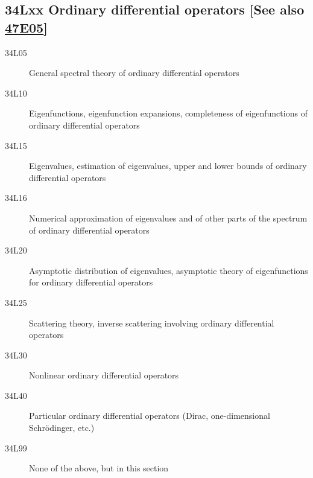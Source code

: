 \subsection*{34Lxx  Ordinary differential operators [See also \hyperref[47E05]{47E05}] }\label{34Lxx}
\begin{description}  
\item [34L05]\label{34L05} General spectral theory of ordinary differential operators
\item [34L10]\label{34L10} Eigenfunctions, eigenfunction expansions, completeness of eigenfunctions of ordinary differential operators
\item [34L15]\label{34L15} Eigenvalues, estimation of eigenvalues, upper and lower bounds of ordinary differential operators
\item [34L16]\label{34L16} Numerical approximation of eigenvalues and of other parts of the spectrum of ordinary differential operators
\item [34L20]\label{34L20} Asymptotic distribution of eigenvalues, asymptotic theory of eigenfunctions for ordinary differential operators
\item [34L25]\label{34L25} Scattering theory, inverse scattering involving ordinary differential operators
\item [34L30]\label{34L30} Nonlinear ordinary differential operators
\item [34L40]\label{34L40} Particular ordinary differential  operators (Dirac, one-dimensional Schr\"{o}dinger, etc.)
\item [34L99]\label{34L99} None of the above, but in this section
\end{description}
